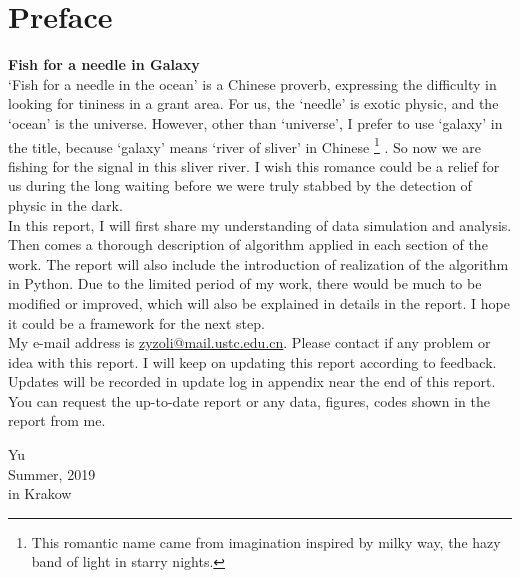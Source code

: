 \documentclass[
12pt, %
a4paper %
]{extreport}
\theoremstyle{plain}
\begin{document}
\chapter*{Preface}
\textbf{\LARGE Fish for a needle in Galaxy}\\
‘Fish for a needle in the ocean’ is a Chinese proverb, expressing the difficulty in looking for tininess in a grant area. For us, the ‘needle’ is exotic physic, and the ‘ocean’ is the universe. However, other than ‘universe’, I prefer to use ‘galaxy’ in the title, because ‘galaxy’ means ‘river of sliver’ in Chinese
\footnote{This romantic name came from imagination inspired by milky way, the hazy band of light in starry nights.}
. So now we are fishing for the signal in this sliver river. I wish this romance could be a relief for us during the long waiting before we were truly stabbed by the detection of physic in the dark.\\
In this report, I will first share my understanding of data simulation and analysis. Then comes a thorough description of algorithm applied in each section of the work. The report will also include the introduction of realization of the algorithm in Python. Due to the limited period of my work, there would be much to be modified or improved, which will also be explained in details in the report. I hope it could be a framework for the next step.\\
My e-mail address is \underline{zyzoli@mail.ustc.edu.cn}. Please contact if any problem or idea with this report. I will keep on updating this report according to feedback. Updates will be recorded in update log in appendix near the end of this report. You can request the up-to-date report or any data, figures, codes shown in the report from me.
\begin{flushright}
Yu\\
Summer, 2019\\
in Krakow
\end{flushright}
\newpage


\tableofcontents{} %

\listoffigures{} %
\end{document}
